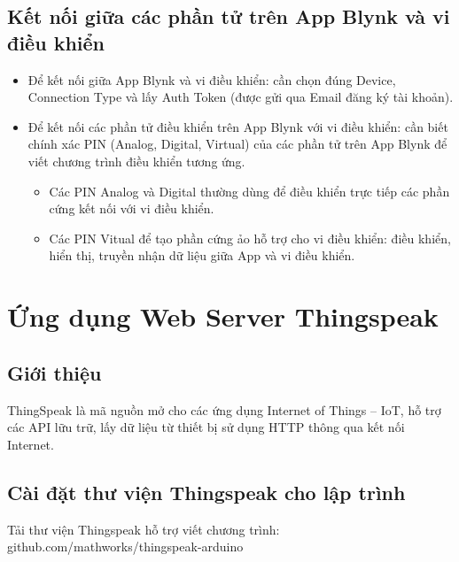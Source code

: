 \subsection{Kết nối giữa các phần tử trên App Blynk và vi điều khiển}
    \begin{itemize}
        \item Để kết nối giữa App Blynk và vi điều khiển: cần chọn đúng Device, Connection Type và lấy Auth Token (được gửi qua Email đăng ký tài khoản).
        \item Để kết nối các phần tử điều khiển trên App Blynk với vi điều khiển: cần biết chính xác PIN (Analog, Digital, Virtual) của các phần tử trên App Blynk để viết chương trình điều khiển tương ứng.
            \begin{itemize}
                \item Các PIN Analog và Digital thường dùng để điều khiển trực tiếp các phần cứng kết nối với vi điều khiển.
                \item Các PIN Vitual để tạo phần cứng ảo hỗ trợ cho vi điều khiển: điều khiển, hiển thị, truyền nhận dữ liệu giữa App và vi điều khiển.
            \end{itemize}
    \end{itemize}

\section{Ứng dụng Web Server Thingspeak}
\subsection{Giới thiệu}
    ThingSpeak là mã nguồn mở cho các ứng dụng Internet of Things -- IoT, hỗ trợ các API lữu trữ, lấy dữ liệu từ thiết bị sử dụng HTTP thông qua kết nối Internet.
\subsection{Cài đặt thư viện Thingspeak cho lập trình}
    Tải thư viện Thingspeak hỗ trợ viết chương trình: github.com/mathworks/thingspeak-arduino
